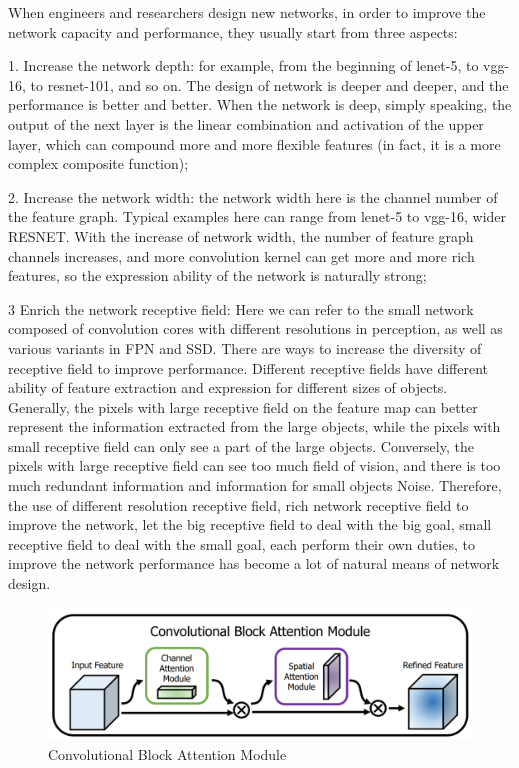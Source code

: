 When engineers and researchers design new networks, in order to improve the network capacity and performance, they usually start from three aspects: 

1. Increase the network depth: for example, from the beginning of lenet-5, to vgg-16, to resnet-101, and so on. The design of network is deeper and deeper, and the performance is better and better. When the network is deep, simply speaking, the output of the next layer is the linear combination and activation of the upper layer, which can compound more and more flexible features (in fact, it is a more complex composite function); 

2. Increase the network width: the network width here is the channel number of the feature graph. Typical examples here can range from lenet-5 to vgg-16, wider RESNET. With the increase of network width, the number of feature graph channels increases, and more convolution kernel can get more and more rich features, so the expression ability of the network is naturally strong; 

3 Enrich the network receptive field: Here we can refer to the small network composed of convolution cores with different resolutions in perception, as well as various variants in FPN and SSD. There are ways to increase the diversity of receptive field to improve performance. Different receptive fields have different ability of feature extraction and expression for different sizes of objects. Generally, the pixels with large receptive field on the feature map can better represent the information extracted from the large objects, while the pixels with small receptive field can only see a part of the large objects. Conversely, the pixels with large receptive field can see too much field of vision, and there is too much redundant information and information for small objects Noise. Therefore, the use of different resolution receptive field, rich network receptive field to improve the network, let the big receptive field to deal with the big goal, small receptive field to deal with the small goal, each perform their own duties, to improve the network performance has become a lot of natural means of network design. 

\begin{figure}[H]
  \centering
  \includegraphics[width=\linewidth]{figs/attention1.png}
  \caption{Convolutional Block Attention Module}
  \label{fig:example}
\end{figure}

